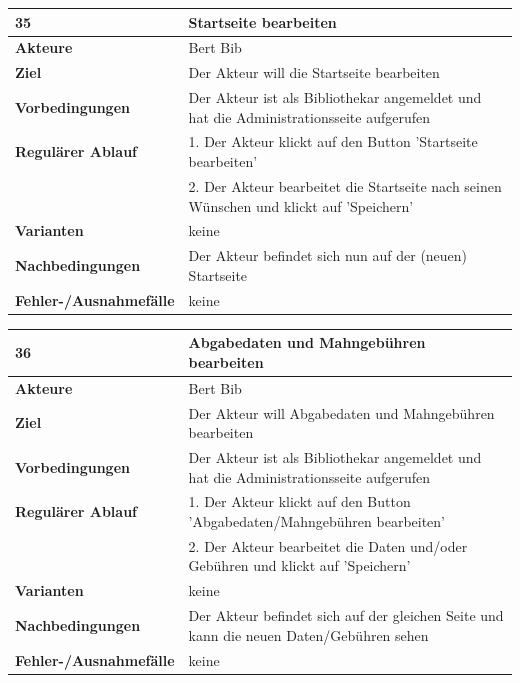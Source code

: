 \documentclass[fontsize=12pt,paper=a4,twoside]{scrartcl}
\begin{document}
\begin{table}[htbp]
\label{35}
\begin{tabular}{|l|p{10cm}|}
\hline 
\textbf{35} & \textbf{Startseite bearbeiten} \\ \hline
\textbf{Akteure} & Bert Bib\\ \hline
\textbf{Ziel} & Der Akteur will die Startseite bearbeiten \\ \hline
\textbf{Vorbedingungen} & Der Akteur ist als Bibliothekar angemeldet und hat die 
Administrationsseite aufgerufen\\\hline
\textbf{Regulärer Ablauf} & 
1. Der Akteur klickt auf den Button 'Startseite bearbeiten' \\
&2. Der Akteur bearbeitet die Startseite nach seinen Wünschen und klickt auf 'Speichern'\\
\hline
\textbf{Varianten} & 
keine \\ \hline
\textbf{Nachbedingungen} & Der Akteur befindet sich nun auf der (neuen) Startseite \\ \hline
\textbf{Fehler-/Ausnahmefälle} & keine\\
\hline
\end{tabular}
\end{table}

\begin{table}[htbp]
\label{36}
\begin{tabular}{|l|p{10cm}|}
\hline 
\textbf{36} & \textbf{Abgabedaten und Mahngebühren bearbeiten} \\ \hline
\textbf{Akteure} & Bert Bib\\ \hline
\textbf{Ziel} & Der Akteur will Abgabedaten und Mahngebühren bearbeiten \\ \hline
\textbf{Vorbedingungen} & Der Akteur ist als Bibliothekar angemeldet und hat die Administrationsseite 
aufgerufen \\ \hline
\textbf{Regulärer Ablauf} & 
1. Der Akteur klickt auf den Button 'Abgabedaten/Mahngebühren bearbeiten' \\
&2. Der Akteur bearbeitet die Daten und/oder Gebühren und klickt auf 'Speichern'\\
\hline
\textbf{Varianten} & 
keine \\ \hline
\textbf{Nachbedingungen} & Der Akteur befindet sich auf der gleichen Seite und kann die neuen 
Daten/Gebühren sehen\\ \hline
\textbf{Fehler-/Ausnahmefälle} & keine\\
\hline
\end{tabular}
\end{table}
\end{document}
